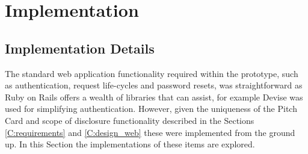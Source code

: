 \chapter{Implementation}\label{C:webApplicationImplementation}

\section{Implementation Details}
The standard web application functionality required within the prototype, such as authentication, request life-cycles and password resets, was straightforward as Ruby on Rails offers a wealth of libraries that can assist, for example Devise \cite{Devise:online} was used for simplifying authentication. However, given the uniqueness of the Pitch Card and scope of disclosure functionality described in the Sections \ref{C:requirements} and \ref{C:design_web} these were implemented from the ground up. In this Section the implementations of these items are explored.

